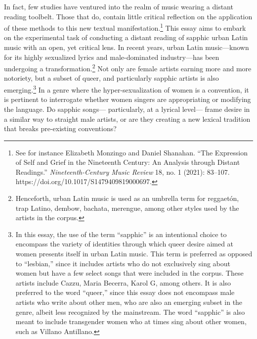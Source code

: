 \documentclass[
  letterpaper,
  DIV=11,
  numbers=noendperiod]{scrartcl}
\begin{document}
In fact, few studies have ventured into the realm of music wearing a
distant reading toolbelt. Those that do, contain little critical
reflection on the application of these methods to this new textual
manifestation.\footnote{See for instance Elizabeth Monzingo and Daniel
  Shanahan. ``The Expression of Self and Grief in the Nineteenth
  Century: An Analysis through Distant Readings.''
  \emph{Nineteenth-Century Music Review} 18, no. 1 (2021): 83--107.
  https://doi.org/10.1017/S1479409819000697.} This essay aims to embark
on the experimental task of conducting a distant reading of sapphic
urban Latin music with an open, yet critical lens. In recent years,
urban Latin music---known for its highly sexualized lyrics and
male-dominated industry---has been undergoing a
transformation.\footnote{Henceforth, urban Latin music is used as an
  umbrella term for reggaetón, trap Latino, dembow, bachata, merengue,
  among other styles used by the artists in the corpus.} Not only are
female artists earning more and more notoriety, but a subset of queer,
and particularly sapphic artists is also emerging.\footnote{In this
  essay, the use of the term ``sapphic'' is an intentional choice to
  encompass the variety of identities through which queer desire aimed
  at women presents itself in urban Latin music. This term is preferred
  as opposed to ``lesbian,'' since it includes artists who do not
  exclusively sing about women but have a few select songs that were
  included in the corpus. These artists include Cazzu, Maria Becerra,
  Karol G, among others. It is also preferred to the word ``queer,''
  since this essay does not encompass male artists who write about other
  men, who are also an emerging subset in the genre, albeit less
  recognized by the mainstream. The word ``sapphic'' is also meant to
  include transgender women who at times sing about other women, such as
  Villano Antillano.} In a genre where the hyper-sexualization of women
is a convention, it is pertinent to interrogate whether women singers
are appropriating or modifying the language. Do sapphic songs---
particularly, at a lyrical level--- frame desire in a similar way to
straight male artists, or are they creating a new lexical tradition that
breaks pre-existing conventions?
\end{document}
